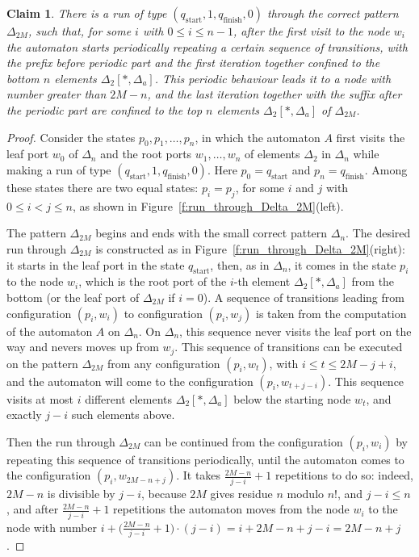\documentclass[12pt,a4paper]{article}
\newtheorem{claim}{Claim}
\theoremstyle{definition}
\begin{document}
\begin{claim}\label{claim_run_Delta_2M_from_w_to_w}
There is a run of type $(q_{\text{start}},1,q_{\text{finish}},0)$
through the correct pattern $\Delta_{2M}$,
such that, for some $i$ with $0 \leqslant i \leqslant n-1$, after the first visit to the node $w_i$
the automaton starts periodically repeating a certain sequence of transitions,
with the prefix before periodic part and the first iteration together
confined to the bottom $n$ elements $\Delta_2[*,\Delta_a]$.
This periodic behaviour leads it to a node with number greater than $2M-n$,
and the last iteration together with the suffix after the periodic part
are confined to the top $n$ elements $\Delta_2[*,\Delta_a]$ of $\Delta_{2M}$.
\end{claim}
\begin{proof}
Consider the states $p_0, p_1, \ldots, p_n$, 
in which the automaton $A$ first visits the leaf port $w_0$ of $\Delta_n$
and the root ports $w_1,\ldots,w_n$ of elements $\Delta_2$ in $\Delta_n$
while making a run of type $(q_{\text{start}},1,q_{\text{finish}},0)$.
Here $p_0 = q_{\text{start}}$ and $p_n = q_{\text{finish}}$.
Among these states there are two equal states:
$p_i = p_j$, for some $i$ and $j$ with $0 \leqslant i < j \leqslant n$,
as shown in Figure~\ref{f:run_through_Delta_2M}(left).

The pattern $\Delta_{2M}$ begins and ends with the small correct pattern $\Delta_n$.
The desired run through $\Delta_{2M}$ is constructed
as in Figure~\ref{f:run_through_Delta_2M}(right):
it starts in the leaf port in the state $q_{\text{start}}$,
then, as in $\Delta_n$, it comes in the state $p_i$ to the node $w_i$,
which is the root port of the $i$-th element $\Delta_2[*,\Delta_a]$ from the bottom
(or the leaf port of $\Delta_{2M}$ if $i = 0$).
A sequence of transitions leading from configuration $(p_i,w_i)$ to configuration $(p_i,w_j)$
is taken from the computation of the automaton $A$ on $\Delta_n$.
On $\Delta_n$, this sequence never visits the leaf port on the way
and nevers moves up from $w_j$.
This sequence of transitions can be executed on the pattern $\Delta_{2M}$ 
from any configuration $(p_i, w_t)$, with $i \leqslant t \leqslant 2M-j+i$,
and the automaton will come to the configuration $(p_i,w_{t+j-i})$. 
This sequence visits at most $i$ different elements $\Delta_2[*,\Delta_a]$ below the starting node $w_t$, 
and exactly $j-i$ such elements above. 

Then the run through $\Delta_{2M}$
can be continued from the configuration $(p_i,w_i)$
by repeating this sequence of transitions periodically,
until the automaton comes to the configuration $(p_i, w_{2M-n+j})$.
It takes $\frac{2M-n}{j-i}+1$ repetitions to do so:
indeed, $2M-n$ is divisible by $j-i$,
because $2M$ gives residue $n$ modulo $n!$, and $j-i \leqslant n$,
and after $\frac{2M-n}{j-i}+1$ repetitions the automaton moves from the node $w_i$
to the node with number $i+\big(\frac{2M-n}{j-i}+1\big) \cdot (j-i) = i + 2M - n + j - i = 2M-n+j$.


\end{proof}
\end{document}
